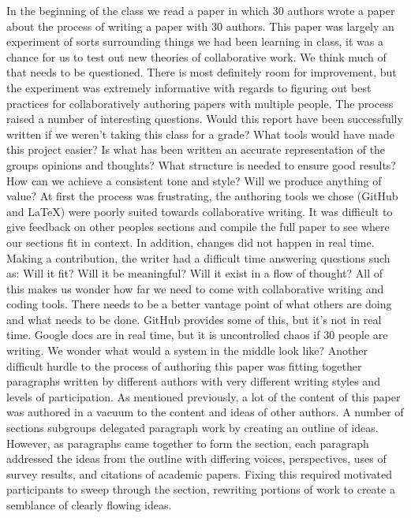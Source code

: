 In the beginning of the class we read a paper \cite{tomlinson2012} in which 30 authors wrote a paper about the process of writing a paper with 30 authors. This paper was largely an experiment of sorts surrounding things we had been learning in class, it was a chance for us to test out new theories of collaborative work.
We think much of that needs to be questioned. There is most definitely room for improvement, but the experiment was extremely informative with regards to figuring out best practices for collaboratively authoring papers with multiple people.  
The process raised a number of interesting questions.
Would this report have been successfully written if we weren't taking this class for a grade?
What tools would have made this project easier? 
Is what has been written an accurate representation of the groups opinions and thoughts? 
What structure is needed to ensure good results?
How can we achieve a consistent tone and style? 
Will we produce anything of value?
At first the process was frustrating, the authoring tools we chose (GitHub and LaTeX) were poorly suited towards collaborative writing. It was difficult to give feedback on other peoples sections and compile the full paper to see where our sections fit in context. In addition, changes did not happen in real time. Making a contribution, the writer had a difficult time answering questions such as: Will it fit? Will it be meaningful? Will it exist in a flow of thought? All of this makes us wonder how far we need to come with collaborative writing and coding tools. There needs to be a better vantage point of what others are doing and what needs to be done. GitHub provides some of this, but it's not in real time. Google docs are in real time, but it is uncontrolled chaos if 30 people are writing. We wonder what would a system in the middle look like? 
Another difficult hurdle to the process of authoring this paper was fitting together paragraphs written by different authors with very different writing styles and levels of participation. As mentioned previously, a lot of the content of this paper was authored in a vacuum to the content and ideas of other authors. A number of sections subgroups delegated paragraph work by creating an outline of ideas. However, as paragraphs came together to form the section, each paragraph addressed the ideas from the outline with differing voices, perspectives, uses of survey results, and citations of academic papers. Fixing this required motivated participants to sweep through the section, rewriting portions of work to create a semblance of clearly flowing ideas.

